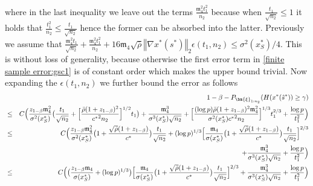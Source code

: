 \documentclass[mnsc,blindrev]{informs4} %
\newcommand{\norm}[1]{\left \Vert #1 \right\Vert}
\begin{document}
where in the last inequality we leave out the terms $\frac{\mathfrak{m}_4^2t_1^2}{n_2}$ because when $\frac{t_1}{\sqrt{n_2}}\leq 1$ it holds that $\frac{t_1^2}{n_2}\leq \frac{t_1}{\sqrt{n_2}}$ hence the former can be absorbed into the latter. Previously we assume that $\frac{\mathfrak{m}_4^2t_1}{\sqrt{n_2}}+\frac{\mathfrak{m}_4^2t_1^2}{n_2}+16\mathfrak{m}_4 \sqrt{\bar{\rho}}\norm{\nabla x^*(s^*)}_2\epsilon(t_1,n_2)\leq \sigma^2(x^*_S)/4$. This is without loss of generality, because otherwise the first error term in \eqref{finite sample error:gsc1} is of constant order which makes the upper bound trivial. Now expanding the $\epsilon(t_1,n_2)$ we further bound the error as follows
\begin{eqnarray}
\notag&&1-\beta-P_{\bm{\xi}_{1:n_2}}(H(x^*(\hat s^*))\geq \gamma)\\
\notag&\leq &C\Big(\frac{z_{1-\beta}\mathfrak{m}_4^2}{\sigma^2(x^*_S)}\big(\frac{t_1}{\sqrt{n_2}}+\Big[\frac{\bar{\rho}(1+z_{1-\beta})^2}{{c^*}^2n_2}\Big]^{1/2}t_1\big)+\frac{\mathfrak{m}_4^3}{\sigma^3(x^*_S)\sqrt{n_2}}+\Big[\frac{(\log p)\bar{\rho}(1+z_{1-\beta})^2\mathfrak{m}_4^2}{\sigma^2(x^*_S){c^*}^2n_2}\Big]^{1/3}t_1^{2/3}+\frac{\log p}{t_1^2}\Big)\\
\notag&\leq &C\Big(\frac{z_{1-\beta}\mathfrak{m}_4^2}{\sigma^2(x^*_S)}\big(1+\frac{\sqrt{\bar{\rho}}(1+z_{1-\beta})}{c^*}\big)\frac{t_1}{\sqrt{n_2}}+(\log p)^{1/3}\Big[\frac{\mathfrak{m}_4}{\sigma(x^*_S)}\big(1+\frac{\sqrt{\bar{\rho}}(1+z_{1-\beta})}{c^*}\big)\frac{t_1}{\sqrt{n_2}}\Big]^{2/3}\\
\notag&&\hspace{5ex}+\frac{\mathfrak{m}_4^3}{\sigma^3(x^*_S)\sqrt{n_2}}+\frac{\log p}{t_1^2}\Big)\\
\notag&\leq &C\Big(\big(\frac{z_{1-\beta}\mathfrak{m}_4}{\sigma(x^*_S)}+(\log p)^{1/3}\big)\Big[\frac{\mathfrak{m}_4}{\sigma(x^*_S)}\big(1+\frac{\sqrt{\bar{\rho}}(1+z_{1-\beta})}{c^*}\big)\frac{t_1}{\sqrt{n_2}}\Big]^{2/3}+\frac{\mathfrak{m}_4^3}{\sigma^3(x^*_S)\sqrt{n_2}}+\frac{\log p}{t_1^2}\Big)\\

\end{eqnarray}
\end{document}
